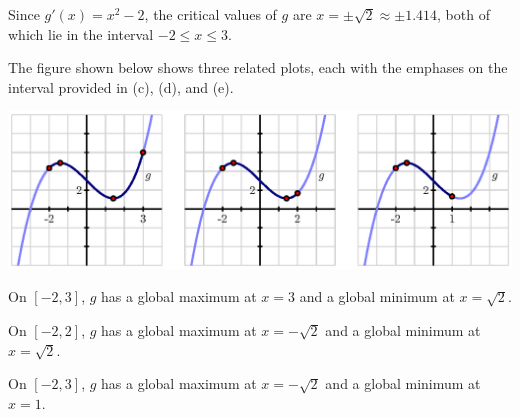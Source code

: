 \begin{activitySolution}
	\ba
	\item Since $g'(x) = x^2 - 2$, the critical values of $g$ are $x = \pm \sqrt{2} \approx \pm 1.414$, both of which lie in the interval $-2 \le x \le 3$.
	\item The figure shown below shows three related plots, each with the emphases on the interval provided in (c), (d), and (e).
	\begin{center}
	\includegraphics{figures/3_3_Act1Soln.eps}
	\end{center}
	\item On $[-2,3]$, $g$ has a global maximum at $x = 3$ and a global minimum at $x = \sqrt{2}$.
	\item On $[-2,2]$, $g$ has a global maximum at $x = -\sqrt{2}$ and a global minimum at $x = \sqrt{2}$.
	\item On $[-2,3]$, $g$ has a global maximum at $x = -\sqrt{2}$ and a global minimum at $x = 1$.
	\ea
\end{activitySolution}
\aftera